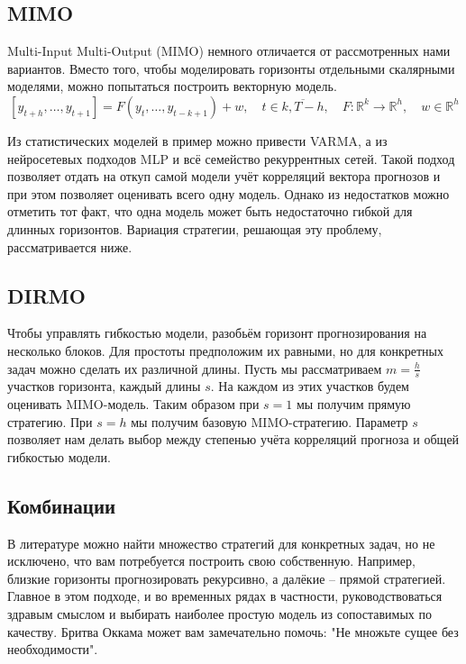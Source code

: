 \documentclass[12pt,fleqn]{article}
\begin{document}
\subsection{MIMO}
Multi-Input Multi-Output (MIMO) немного отличается от рассмотренных нами вариантов.
Вместо того, чтобы моделировать горизонты отдельными скалярными моделями, можно попытаться построить векторную модель.
$$
[y_{t+h}, \ldots, y_{t+1}] = F(y_t, \ldots, y_{t-k+1}) + w, \quad t \in \overline{k, T-h}, \quad F:\mathbb{R}^k \rightarrow \mathbb{R}^h, \quad w \in \mathbb{R}^h
$$

Из статистических моделей в пример можно привести VARMA, а из нейросетевых подходов MLP и всё семейство рекуррентных сетей. Такой подход позволяет отдать на откуп самой модели учёт корреляций вектора прогнозов и при этом позволяет оценивать всего одну модель. Однако из недостатков можно отметить тот факт, что одна модель может быть недостаточно гибкой для длинных горизонтов. Вариация стратегии, решающая эту проблему, рассматривается ниже.

\subsection{DIRMO}
Чтобы управлять гибкостью модели, разобьём горизонт прогнозирования на несколько блоков. Для простоты предположим их равными, но для конкретных задач можно сделать их различной длины. Пусть мы рассматриваем $m=\frac{h}{s}$ участков горизонта, каждый длины $s$. На каждом из этих участков будем оценивать MIMO-модель. Таким образом при $s=1$ мы получим прямую стратегию. При $s=h$ мы получим базовую MIMO-стратегию. Параметр $s$ позволяет нам делать выбор между степенью учёта корреляций прогноза и общей гибкостью модели.

\subsection{Комбинации}
В литературе можно найти множество стратегий для конкретных задач, но не исключено, что вам потребуется построить свою собственную.
Например, близкие горизонты прогнозировать рекурсивно, а далёкие -- прямой стратегией.
Главное в этом подходе, и во временных рядах в частности, руководствоваться здравым смыслом и выбирать наиболее простую модель из сопоставимых по качеству. 
Бритва Оккама может вам замечательно помочь: "Не множьте сущее без необходимости".
\end{document}
